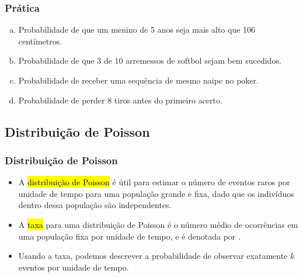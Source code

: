 
\begin{frame}
\frametitle{Prática}
\justifying
{}

\begin{enumerate}[(a)]
\justifying
\item Probabilidade de que um menino de 5 anos seja mais alto que 106 centímetros.
\justifying
\item Probabilidade de que 3 de 10 arremessos de softbol sejam bem sucedidos.
\justifying
\item Probabilidade de receber uma sequência de mesmo naipe no poker.
\justifying
\item Probabilidade de perder 8 tiros antes do primeiro acerto.
\justifying
{}

\end{enumerate}

\end{frame}


\subsection{Distribuição de Poisson}


\begin{frame}
\frametitle{Distribuição de Poisson}

\begin{itemize}
\justifying
\item A \hl {distribuição de Poisson} é útil para estimar o número de eventos raros por unidade de tempo para uma população grande e fixa, dado que os indivíduos dentro dessa população são independentes.
\justifying
\item A \hl{taxa} para uma distribuição de Poisson é o número médio de ocorrências em uma população fixa por unidade de tempo, e é denotada por \mathhl{\lambda}.
\justifying
\item Usando a taxa, podemos descrever a probabilidade de observar exatamente $ k $ eventos por unidade de tempo.

\end{itemize}

\end{frame}

